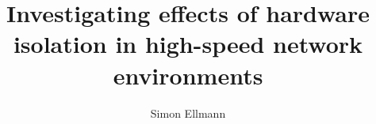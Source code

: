 \usepackage[utf8]{inputenc}
\usepackage{packages}
\usepackage{beamermods}

\author[S. Ellmann]{Simon Ellmann}
\title[Effects of hardware isolation]{Investigating effects of hardware isolation in high-speed network environments}



\date{}




\usepackage{pgfpages}
\usepackage{ifthen}
\newif\ifsolution%

\makeatletter
\let\@@magyar@captionfix\relax
\makeatother
